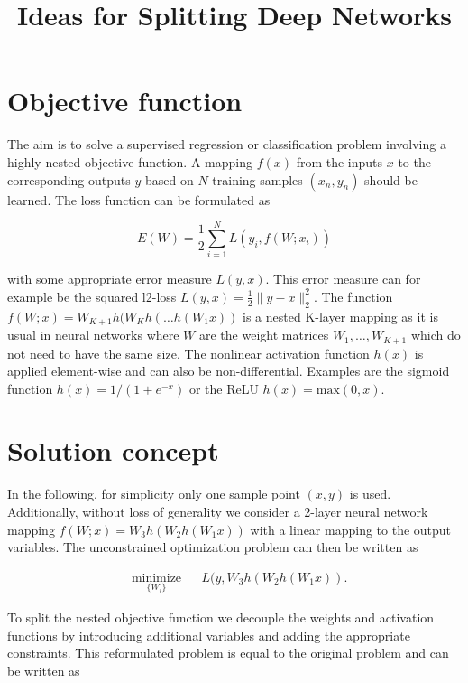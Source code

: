 \documentclass[english,11pt,a4paper]{article}
\title{Ideas for Splitting Deep Networks}
\author{}
\begin{document}
\maketitle

\section{Objective function}

The aim is to solve a supervised regression or classification problem involving a highly nested objective function. A mapping $f(x)$ from the inputs $x$ to the corresponding outputs $y$ based on $N$ training samples $(x_n, y_n)$ should be learned. The loss function can be formulated as

\begin{equation}
E(W) = \frac{1}{2} \sum_{i=1}^{N} L(y_i, f(W;x_i))
\end{equation}

with some appropriate error measure $L(y,x)$. This error measure can for example be the squared l2-loss $L(y,x) = \frac{1}{2} \| y - x \|^2_2$. The function $f(W;x) = W_{K+1}h(W_Kh(\dots h(W_1x))$ is a nested K-layer mapping as it is usual in neural networks where $W$ are the weight matrices $W_1,\dots,W_{K+1}$ which do not need to have the same size. The nonlinear activation function $h(x)$ is applied element-wise and can also be non-differential. Examples are the sigmoid function $h(x) = 1/(1 + e^{-x})$ or the ReLU $h(x) = \mathrm{max}(0, x)$.

\section{Solution concept}

In the following, for simplicity only one sample point $(x,y)$ is used. Additionally, without loss of generality we consider a 2-layer neural network mapping $f(W;x) = W_3h(W_2h(W_1x))$ with a linear mapping to the output variables. The unconstrained optimization problem can then be written as

\begin{equation}
	\begin{aligned}
		& \underset{\{W_i\}}{\text{minimize}}
		& & L(y,W_3h(W_2h(W_1x)).
	\end{aligned}
\end{equation}

To split the nested objective function we decouple the weights and activation functions
by introducing additional variables and adding the appropriate constraints. This reformulated problem is equal to the original problem and can be written as
\end{document}

